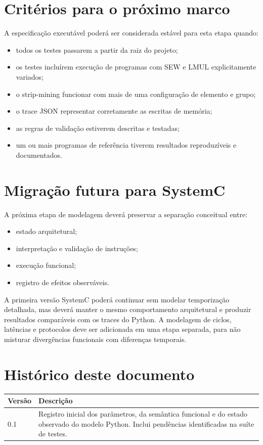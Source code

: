 \section{Critérios para o próximo marco}

A especificação executável poderá ser considerada estável para esta
etapa quando:

\begin{itemize}
    \item todos os testes passarem a partir da raiz do projeto;
    \item os testes incluírem execução de programas com SEW e LMUL
    explicitamente variados;
    \item o strip-mining funcionar com mais de uma configuração de
    elemento e grupo;
    \item o trace JSON representar corretamente as escritas de memória;
    \item as regras de validação estiverem descritas e testadas;
    \item um ou mais programas de referência tiverem resultados
    reproduzíveis e documentados.
\end{itemize}

\section{Migração futura para SystemC}

A próxima etapa de modelagem deverá preservar a separação conceitual
entre:

\begin{itemize}
    \item estado arquitetural;
    \item interpretação e validação de instruções;
    \item execução funcional;
    \item registro de efeitos observáveis.
\end{itemize}

A primeira versão SystemC poderá continuar sem modelar temporização
detalhada, mas deverá manter o mesmo comportamento arquitetural e
produzir resultados comparáveis com os traces do Python. A modelagem
de ciclos, latências e protocolos deve ser adicionada em uma etapa
separada, para não misturar divergências funcionais com diferenças
temporais.

\section{Histórico deste documento}

\begin{longtable}{p{2.5cm}p{10.5cm}}
\toprule
\textbf{Versão} & \textbf{Descrição} \\
\midrule
0.1 & Registro inicial dos parâmetros, da semântica funcional e do
estado observado do modelo Python. Inclui pendências identificadas na
suíte de testes. \\
\bottomrule
\end{longtable}